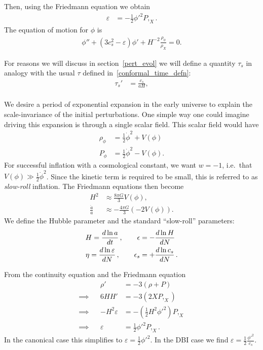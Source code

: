 Then, using the Friedmann equation we obtain
\begin{align}\label{PXepsilon}
    \varepsilon &= -\frac{1}{2}{\phi'}^2P,_X.
\end{align}
The equation of motion for $\phi$ is~\cite{Hu_2011}
\begin{align}\label{phieom}
    \phi''+(3c_s^2-\varepsilon)\phi'+H^{-2}\frac{\rho_\phi}{\rho_X}=0.
\end{align}


    For reasons we will discuss in section~\ref{pert_evol} we will
    define a quantity $\tau_s$
    in analogy with the usual $\tau$ defined in~\eqref{conformal_time_defn}:
    \begin{align}\label{tausdef}
        \tau_s'&=\frac{c_s}{aH},\\
    \end{align}


    We desire a period of exponential expansion in the early universe to explain the
    scale-invariance of the initial perturbations.
    One simple way one could imagine driving this expansion is through a single
    scalar field. This scalar field would have
    \begin{align}
        \rho_\phi &= \frac{1}{2}\dot{\phi}^2+V(\phi)\\
        P_\phi &= \frac{1}{2}\dot{\phi}^2-V(\phi).
    \end{align}
    For successful inflation with a cosmological constant, we want $w=-1$,
    i.e.\ that $V(\phi)\gg\frac{1}{2}\dot{\phi}^2$. Since the kinetic term is required to
    be small, this is referred to as \textit{slow-roll} inflation.
    The Friedmann equations then become
    \begin{align}
        H^2 &\approx \frac{8\pi G}{3}V(\phi),\\
        \frac{\ddot{a}}{a} &\approx -\frac{4\pi G}{3}\left(-2V(\phi)\right).
    \end{align}
We define the Hubble parameter and the standard ``slow-roll'' parameters:
\begin{equation}
\label{slowrollparams}
\begin{split}
    H = \frac{d\ln a}{dt}	\,,
    \qquad
    \epsilon &= -\frac{d\ln H}{dN}	\\
    \eta = \frac{d\ln \varepsilon}{dN}	\,,
    \qquad
    \epsilon_s &= +\frac{d\ln c_s}{dN}	\,.
\end{split}
\end{equation}

From the continuity equation and the Friedmann equation
\begin{align}
    &&\rho' &= -3(\rho+P)\\
    \implies&&6HH' &= -3(2X P,_{X})\\
    \implies&&-H^2\varepsilon &= -\left(\frac{1}{2}H^2{\phi'}^2\right) P,_{X}\\
    \implies&&\varepsilon &= \frac{1}{2}{\phi'}^2 P,_{X}.
\end{align}
In the canonical case this simplifies to
$\varepsilon = \frac{1}{2}{\phi'}^2$.
In the DBI case we find
$\varepsilon = \frac{1}{2}\frac{{\phi'}^2}{c_s}$.


